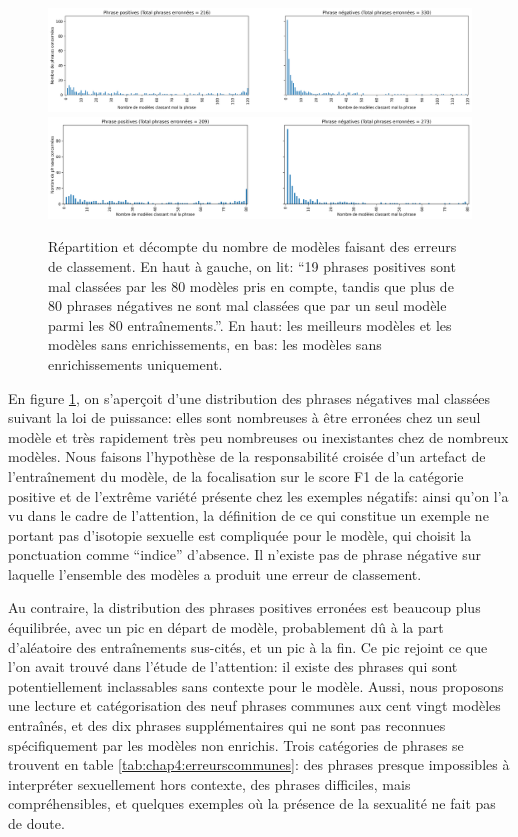 \begin{figure}[ht]
    \centering
    \includegraphics[width=\linewidth]{figures/commonErrors.png}
    \includegraphics[width=\linewidth]{figures/commonErrorsNotEnriched.png}
    \caption{Répartition et décompte du nombre de modèles faisant des erreurs de classement. En haut à gauche, on lit: ``19 phrases positives sont mal classées par les 80 modèles pris en compte, tandis que plus de 80 phrases négatives ne sont mal classées que par un seul modèle parmi les 80 entraînements.''. En haut: les meilleurs modèles et les modèles sans enrichissements, en bas: les modèles sans enrichissements uniquement.}
    \label{fig:chap4:commonErrors}
\end{figure}


En figure \ref{fig:chap4:commonErrors}, on s'aperçoit d'une distribution des phrases négatives mal classées suivant la loi de puissance: elles sont nombreuses à être erronées chez un seul modèle et très rapidement très peu nombreuses ou inexistantes chez de nombreux modèles. Nous faisons l'hypothèse de la responsabilité croisée d'un artefact de l'entraînement du modèle, de la focalisation sur le score F1 de la catégorie positive et de l'extrême variété présente chez les exemples négatifs: ainsi qu'on l'a vu dans le cadre de l'attention, la définition de ce qui constitue un exemple ne portant pas d'isotopie sexuelle est compliquée pour le modèle, qui choisit la ponctuation comme ``indice'' d'absence. Il n'existe pas de phrase négative sur laquelle l'ensemble des modèles a produit une erreur de classement.

Au contraire, la distribution des phrases positives erronées est beaucoup plus équilibrée, avec un pic en départ de modèle, probablement dû à la part d'aléatoire des entraînements sus-cités, et un pic à la fin. Ce pic rejoint ce que l'on avait trouvé dans l'étude de l'attention: il existe des phrases qui sont potentiellement inclassables sans contexte pour le modèle. Aussi, nous proposons une lecture et catégorisation des neuf phrases communes aux cent vingt modèles entraînés, et des dix phrases supplémentaires qui ne sont pas reconnues spécifiquement par les modèles non enrichis. Trois catégories de phrases se trouvent en table \ref{tab:chap4:erreurscommunes}: des phrases presque impossibles à interpréter sexuellement hors contexte, des phrases difficiles, mais compréhensibles, et quelques exemples où la présence de la sexualité ne fait pas de doute.

